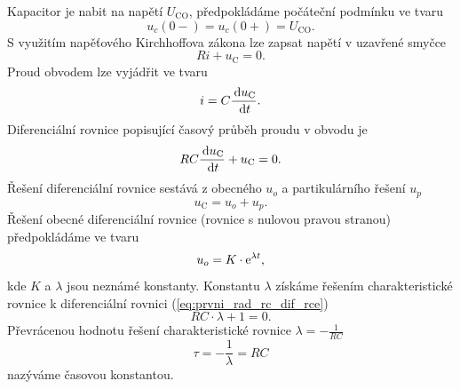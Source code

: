 Kapacitor je nabit na napětí $U_\mathrm{CO}$, předpokládáme počáteční podmínku ve tvaru
$$
u_c(0-) = u_c(0+) = U_\mathrm{CO}.
$$
S využitím napěťového Kirchhoffova zákona lze zapsat napětí v uzavřené smyčce 
$$
Ri + u_\mathrm{C} = 0.
$$
Proud obvodem lze vyjádřit ve tvaru 
$$
i = C \frac{\,\mathrm{d} u_\mathrm{C}}{\,\mathrm{d} t}.
$$
Diferenciální rovnice popisující časový průběh proudu v obvodu je
\begin{equation}
RC \frac{\,\mathrm{d} u_\mathrm{C}}{\,\mathrm{d} t} + u_\mathrm{C} = 0.
\label{eq:prvni_rad_rc_dif_rce}
\end{equation}
Řešení diferenciální rovnice sestává z obecného $u_o$ a partikulárního řešení $u_p$
$$
u_\mathrm{C} = u_o + u_p.
$$
Řešení obecné diferenciální rovnice (rovnice s nulovou pravou stranou) předpokládáme ve tvaru
$$
u_o = K \cdot \mathrm{e}^{\lambda t},
$$
kde $K$ a $\lambda$ jsou neznámé konstanty. Konstantu $\lambda$ získáme řešením charakteristické rovnice k diferenciální rovnici (\ref{eq:prvni_rad_rc_dif_rce})
$$
RC \cdot \lambda + 1 = 0.
$$
Převrácenou hodnotu řešení charakteristické rovnice $\lambda = - \frac{1}{RC}$
$$
\tau = - \frac{1}{\lambda} = RC
$$ 
nazýváme časovou konstantou. 

